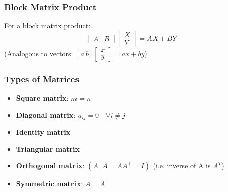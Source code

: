     \subsubsection{Block Matrix Product}
    \begin{definition}
        For a block matrix product:
        \begin{equation}
            \begin{bmatrix}
                A & B
                \end{bmatrix}
                \begin{bmatrix}
                X \\ Y
                \end{bmatrix}
                = AX + BY
        \end{equation}
        (Analogous to vectors: \( [a \ b] \begin{bmatrix} x \\ y \end{bmatrix} = a x + b y \))
    \end{definition}

    \subsubsection{Types of Matrices}
    \begin{definition}
        \begin{itemize}
            \item \textbf{Square matrix}: \(m = n\)
            \item \textbf{Diagonal matrix}: \(a_{ij} = 0 \quad \forall i \neq j\)
            \item \textbf{Identity matrix}
            \item \textbf{Triangular matrix}
            \item \textbf{Orthogonal matrix}: \((A^\top A = A A^\top = I)\) (i.e. inverse of A is $A^T$)
            \item \textbf{Symmetric matrix}: \(A = A^\top\)
        \end{itemize}
    \end{definition}

